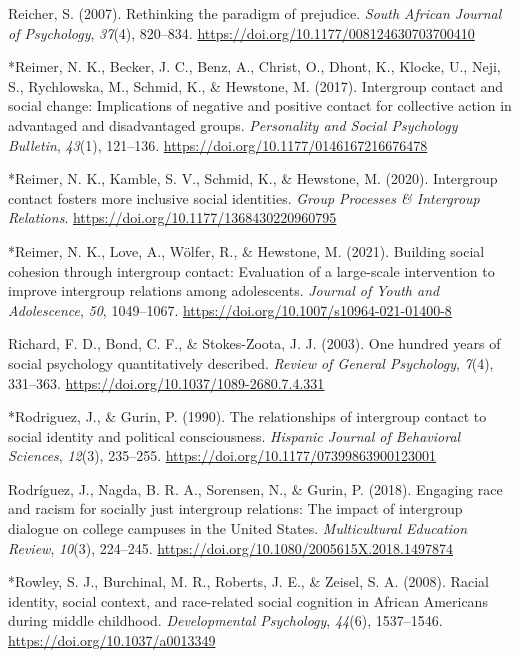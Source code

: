 \documentclass[12pt, letterpaper]{article}
\newenvironment{CSLReferences}[2]{}{}
\begin{document}
\begin{CSLReferences}{1}{0}
\leavevmode\hypertarget{ref-reicher_rethinking_2007}{}%
Reicher, S. (2007). Rethinking the paradigm of prejudice. \emph{South
African Journal of Psychology}, \emph{37}(4), 820--834.
\url{https://doi.org/10.1177/008124630703700410}

\leavevmode\hypertarget{ref-956}{}%
*Reimer, N. K., Becker, J. C., Benz, A., Christ, O., Dhont, K., Klocke,
U., Neji, S., Rychlowska, M., Schmid, K., \& Hewstone, M. (2017).
Intergroup contact and social change: Implications of negative and
positive contact for collective action in advantaged and disadvantaged
groups. \emph{Personality and Social Psychology Bulletin}, \emph{43}(1),
121--136. \url{https://doi.org/10.1177/0146167216676478}

\leavevmode\hypertarget{ref-2380}{}%
*Reimer, N. K., Kamble, S. V., Schmid, K., \& Hewstone, M. (2020).
Intergroup contact fosters more inclusive social identities. \emph{Group
Processes \& Intergroup Relations}.
\url{https://doi.org/10.1177/1368430220960795}

\leavevmode\hypertarget{ref-2399}{}%
*Reimer, N. K., Love, A., Wölfer, R., \& Hewstone, M. (2021). Building
social cohesion through intergroup contact: Evaluation of a large-scale
intervention to improve intergroup relations among adolescents.
\emph{Journal of Youth and Adolescence}, \emph{50}, 1049--1067.
\url{https://doi.org/10.1007/s10964-021-01400-8}

\leavevmode\hypertarget{ref-richard_one_2003}{}%
Richard, F. D., Bond, C. F., \& Stokes-Zoota, J. J. (2003). One hundred
years of social psychology quantitatively described. \emph{Review of
General Psychology}, \emph{7}(4), 331--363.
\url{https://doi.org/10.1037/1089-2680.7.4.331}

\leavevmode\hypertarget{ref-803}{}%
*Rodriguez, J., \& Gurin, P. (1990). The relationships of intergroup
contact to social identity and political consciousness. \emph{Hispanic
Journal of Behavioral Sciences}, \emph{12}(3), 235--255.
\url{https://doi.org/10.1177/07399863900123001}

\leavevmode\hypertarget{ref-rodriguez_engaging_2018}{}%
Rodríguez, J., Nagda, B. R. A., Sorensen, N., \& Gurin, P. (2018).
Engaging race and racism for socially just intergroup relations: The
impact of intergroup dialogue on college campuses in the {United
States}. \emph{Multicultural Education Review}, \emph{10}(3), 224--245.
\url{https://doi.org/10.1080/2005615X.2018.1497874}

\leavevmode\hypertarget{ref-703}{}%
*Rowley, S. J., Burchinal, M. R., Roberts, J. E., \& Zeisel, S. A.
(2008). Racial identity, social context, and race-related social
cognition in {African} {Americans} during middle childhood.
\emph{Developmental Psychology}, \emph{44}(6), 1537--1546.
\url{https://doi.org/10.1037/a0013349}


\end{CSLReferences}
\end{document}
